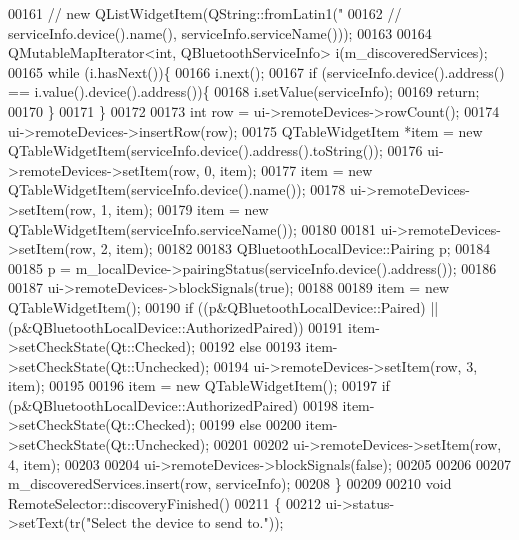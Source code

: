 \begin{DoxyCode}
00161 \textcolor{comment}{//        new
       QListWidgetItem(QString::fromLatin1("%
00162 \textcolor{comment}{//                                                             serviceInfo.device().name(),
       serviceInfo.serviceName()));}
00163 
00164     QMutableMapIterator<int, QBluetoothServiceInfo> i(m\_discoveredServices);
00165     \textcolor{keywordflow}{while} (i.hasNext())\{
00166         i.next();
00167         \textcolor{keywordflow}{if} (serviceInfo.device().address() == i.value().device().address())\{
00168             i.setValue(serviceInfo);
00169             \textcolor{keywordflow}{return};
00170         \}
00171     \}
00172 
00173     \textcolor{keywordtype}{int} row = ui->remoteDevices->rowCount();
00174     ui->remoteDevices->insertRow(row);
00175     QTableWidgetItem *item = \textcolor{keyword}{new} QTableWidgetItem(serviceInfo.device().address().toString());
00176     ui->remoteDevices->setItem(row, 0, item);
00177     item = \textcolor{keyword}{new} QTableWidgetItem(serviceInfo.device().name());
00178     ui->remoteDevices->setItem(row, 1, item);
00179     item = \textcolor{keyword}{new} QTableWidgetItem(serviceInfo.serviceName());
00180 
00181     ui->remoteDevices->setItem(row, 2, item);
00182 
00183     QBluetoothLocalDevice::Pairing p;
00184 
00185     p = m\_localDevice->pairingStatus(serviceInfo.device().address());
00186 
00187     ui->remoteDevices->blockSignals(\textcolor{keyword}{true});
00188 
00189     item = \textcolor{keyword}{new} QTableWidgetItem();
00190     \textcolor{keywordflow}{if} ((p&QBluetoothLocalDevice::Paired) || (p&QBluetoothLocalDevice::AuthorizedPaired))
00191         item->setCheckState(Qt::Checked);
00192     \textcolor{keywordflow}{else}
00193         item->setCheckState(Qt::Unchecked);
00194     ui->remoteDevices->setItem(row, 3, item);
00195 
00196     item = \textcolor{keyword}{new} QTableWidgetItem();
00197     \textcolor{keywordflow}{if} (p&QBluetoothLocalDevice::AuthorizedPaired)
00198         item->setCheckState(Qt::Checked);
00199     \textcolor{keywordflow}{else}
00200         item->setCheckState(Qt::Unchecked);
00201 
00202     ui->remoteDevices->setItem(row, 4, item);
00203 
00204     ui->remoteDevices->blockSignals(\textcolor{keyword}{false});
00205 
00206 
00207     m\_discoveredServices.insert(row, serviceInfo);
00208 \}
00209 
00210 \textcolor{keywordtype}{void} RemoteSelector::discoveryFinished()
00211 \{
00212     ui->status->setText(tr(\textcolor{stringliteral}{"Select the device to send to."}));
}
\end{DoxyCode}
